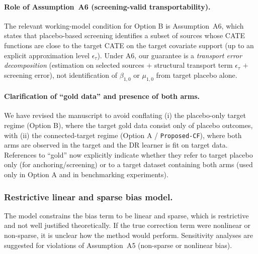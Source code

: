 {\paragraph{Role of Assumption~A6 (screening-valid transportability).}
The relevant working-model condition for Option B is Assumption~A6, which states that placebo-based screening identifies a subset of sources whose CATE functions are close to the target CATE on the target covariate support (up to an explicit approximation level $\epsilon_\tau$). Under A6, our guarantee is a \emph{transport error decomposition} (estimation on selected sources $+$ structural transport term $\epsilon_\tau$ $+$ screening error), not identification of $\beta_{1,0}$ or $\mu_{1,0}$ from target placebo alone.

\paragraph{Clarification of ``gold data'' and presence of both arms.}
We have revised the manuscript to avoid conflating (i) the placebo-only target regime (Option B), where the target gold data consist only of placebo outcomes, with (ii) the connected-target regime (Option A / \texttt{Proposed-CF}), where both arms are observed in the target and the DR learner is fit on target data. References to ``gold'' now explicitly indicate whether they refer to target placebo only (for anchoring/screening) or to a target dataset containing both arms (used only in Option A and in benchmarking experiments).
}

\subsubsection{Restrictive linear and sparse bias model.}  
The model constrains the bias term to be linear and sparse, which is restrictive and not well justified theoretically. If the true correction term were nonlinear or non-sparse, it is unclear how the method would perform. Sensitivity analyses are suggested for violations of Assumption~A5 (non-sparse or nonlinear bias).

